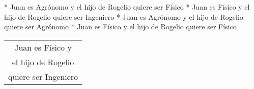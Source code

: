 \begin{enum}
	* Juan es Agr\'onomo y el hijo de Rogelio quiere ser F\'isico
	* Juan es F\'isico y el hijo de Rogelio quiere ser Ingeniero
	* Juan es Agr\'onomo y el hijo de Rogelio quiere ser Agr\'onomo
	* Juan es F\'isico y el hijo de Rogelio quiere ser F\'isico
\end{enum}
\begin{tabular}{c}
	Juan es F\'isico y \\
	el hijo de Rogelio \\
	quiere ser Ingeniero
\end{tabular}
